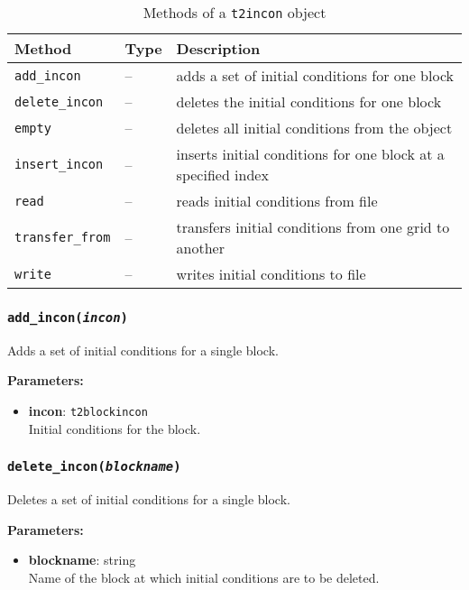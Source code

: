 \begin{table}
  \begin{center}
    \begin{tabular}{|l|l|p{65mm}|}
      \hline
      \textbf{Method} & \textbf{Type} & \textbf{Description}\\
      \hline
      \texttt{add\_incon} & -- & adds a set of initial conditions for one block\\
      \texttt{delete\_incon} & -- & deletes the initial conditions for one block\\
      \texttt{empty} & -- & deletes all initial conditions from the object\\
      \texttt{insert\_incon} & -- & inserts initial conditions for one block at a specified index\\
      \texttt{read} & -- & reads initial conditions from file\\
      \texttt{transfer\_from} & -- & transfers initial conditions from one grid to another\\
      \texttt{write} & -- & writes initial conditions to file\\
      \hline
    \end{tabular}
    \caption{Methods of a \texttt{t2incon} object}
    \label{tb:t2incon_methods}
  \end{center}
\end{table}

\subsubsection{\texttt{add\_incon(\emph{incon})}}

Adds a set of initial conditions for a single block.

\textbf{Parameters:}
\begin{itemize}
\item \textbf{incon}: \texttt{t2blockincon}\\
  Initial conditions for the block.
\end{itemize}

\subsubsection{\texttt{delete\_incon(\emph{blockname})}}

Deletes a set of initial conditions for a single block.

\textbf{Parameters:}
\begin{itemize}
\item \textbf{blockname}: string\\
  Name of the block at which initial conditions are to be deleted.
\end{itemize}

